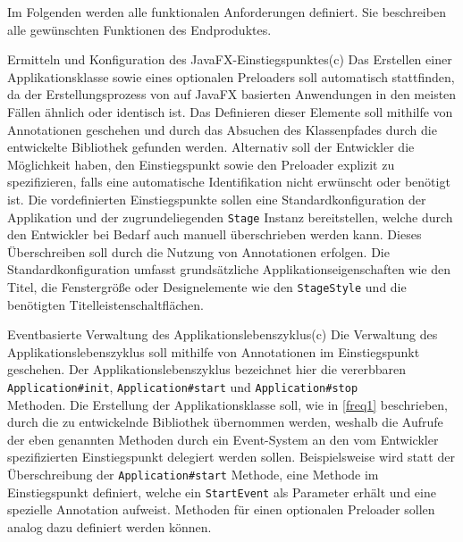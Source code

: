 Im Folgenden werden alle funktionalen Anforderungen definiert. Sie beschreiben alle gewünschten Funktionen des Endproduktes.
\begin{freq}{Ermitteln und Konfiguration des JavaFX-Einstiegspunktes}(c)
	Das Erstellen einer Applikationsklasse sowie eines optionalen Preloaders soll automatisch stattfinden, da der Erstellungsprozess von auf JavaFX basierten Anwendungen in den meisten Fällen ähnlich oder identisch ist. Das Definieren dieser Elemente soll mithilfe von Annotationen geschehen und durch das Absuchen des Klassenpfades durch die entwickelte Bibliothek gefunden werden. Alternativ soll der Entwickler die Möglichkeit haben, den Einstiegspunkt sowie den Preloader explizit zu spezifizieren, falls eine automatische Identifikation nicht erwünscht oder benötigt ist. Die vordefinierten Einstiegspunkte sollen eine Standardkonfiguration der Applikation und der zugrundeliegenden \texttt{Stage} Instanz bereitstellen, welche durch den Entwickler bei Bedarf auch manuell überschrieben werden kann. Dieses Überschreiben soll durch die Nutzung von Annotationen erfolgen. Die Standardkonfiguration umfasst grundsätzliche Applikationseigenschaften wie den Titel, die Fenstergröße oder Designelemente wie den \texttt{StageStyle} und die benötigten Titelleistenschaltflächen.
\end{freq}
\begin{freq}{Eventbasierte Verwaltung des Applikationslebenszyklus}(c)
	Die Verwaltung des Applikationslebenszyklus soll mithilfe von Annotationen im Einstiegspunkt geschehen. Der Applikationslebenszyklus bezeichnet hier die vererbbaren \texttt{Application\#init}, \texttt{Application\#start} und \texttt{Application\#stop}\\ Methoden. Die Erstellung der Applikationsklasse soll, wie in \autoref{freq1} beschrieben, durch die zu entwickelnde Bibliothek übernommen werden, weshalb die Aufrufe der eben genannten Methoden durch ein Event-System an den vom Entwickler spezifizierten Einstiegspunkt delegiert werden sollen. Beispielsweise wird statt der Überschreibung der \texttt{Application\#start} Methode, eine Methode im Einstiegspunkt definiert, welche ein \texttt{StartEvent} als Parameter erhält und eine spezielle Annotation aufweist. Methoden für einen optionalen Preloader sollen analog dazu definiert werden können.
\end{freq}
